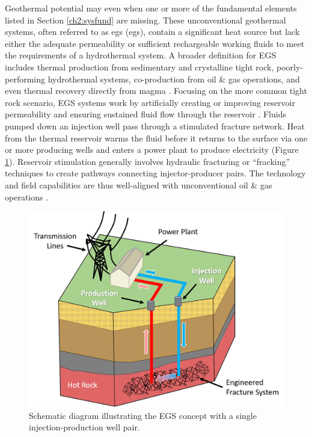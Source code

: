 Geothermal potential may even when one or more of the fundamental elements listed in Section \ref{ch2:sysfund} are missing. These unconventional geothermal systems, often referred to as \acrlong{egs} (\acrshort{egs}), contain a significant heat source but lack either the adequate permeability or sufficient rechargeable working fluids to meet the requirements of a hydrothermal system. A broader definition for EGS includes thermal production from sedimentary and crystalline tight rock, poorly-performing hydrothermal systems, co-production from oil \& gas operations, and even thermal recovery directly from magma \citep{tester_future_2006}. Focusing on the more common tight rock scenario, EGS systems work by artificially creating or improving reservoir permeability and ensuring sustained fluid flow through the reservoir \citep[p.\ 281]{glassley_geothermal_2015}. Fluids pumped down an injection well pass through a stimulated fracture network. Heat from the thermal reservoir warms the fluid before it returns to the surface via one or more producing wells and enters a power plant to produce electricity (Figure \ref{fig:egs_schematic}). Reservoir stimulation generally involves hydraulic fracturing or ``fracking” techniques to create pathways connecting injector-producer pairs. The technology and field capabilities are thus well-aligned with unconventional oil \& gas operations \citep{petty_synergies_2009}. 

\begin{figure}%
\centering
\includegraphics[width=.85\textwidth]{templates/images/Figure-EGS_Schematic.png}
\caption[EGS schematic]{Schematic diagram illustrating the EGS concept with a single injection-production well pair.}
\label{fig:egs_schematic}
\end{figure}

